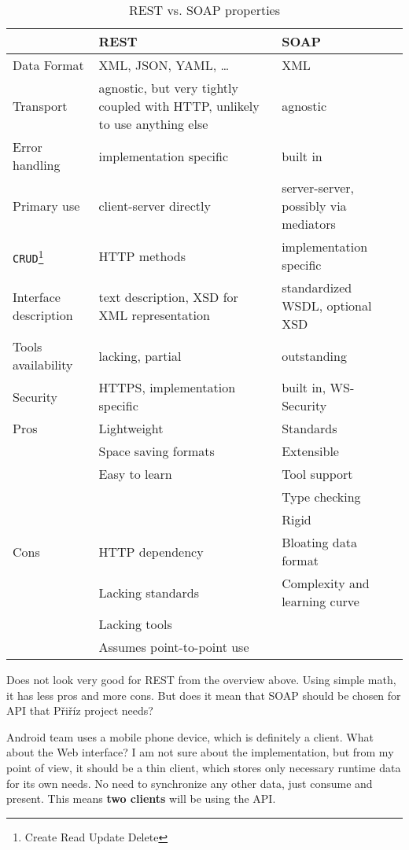 	\begin{table}[h]\centering
	 	\begin{minipage}{12.9cm}
		\begin{tabular}{p{2cm}|p{4.75cm}|p{4.75cm}}
		\hline
		& REST & SOAP\\
		\hline
		Data Format & XML, JSON, YAML, \ldots & XML \\
		Transport & agnostic, but very tightly coupled with HTTP, unlikely to use anything else & agnostic \\
		Error handling & implementation specific & built in \\
		Primary use & client-server directly & server-server, possibly via mediators \\
		\verb|CRUD|\footnote{Create Read Update Delete} & HTTP methods & implementation specific \\
		Interface description & text description, XSD for XML representation & standardized WSDL, optional XSD \\
		Tools availability & lacking, partial & outstanding \\
		Security & HTTPS, implementation specific  & built in, WS-Security \\
		\hline
		Pros & Lightweight & Standards \\
			 & Space saving formats & Extensible \\
			 & Easy to learn & Tool support \\
			 &  & Type checking \\
			 &  & Rigid \\
		Cons & HTTP dependency & Bloating data format \\
			 & Lacking standards & Complexity and learning curve \\
			 & Lacking tools &  \\
			 & Assumes point-to-point use &  \\
		\end{tabular}
	    \renewcommand{\footnoterule}{}
	    \end{minipage}
	\caption{REST vs. SOAP properties}
	\label{tab:rest_vs_soap}
	\end{table}
	
	Does not look very good for REST from the overview above. Using simple math, it has less pros and more cons. But does
	it mean that SOAP should be chosen for API that Přiříz project needs?
	
	Android team uses a mobile phone device, which is definitely a client. What about the Web interface? I am not sure
	about the implementation, but from my point of view, it should be a thin client, which stores only necessary runtime
	data for its own needs. No need to synchronize any other data, just consume and present. This means \textbf{two
	clients} will be using the API.
	
